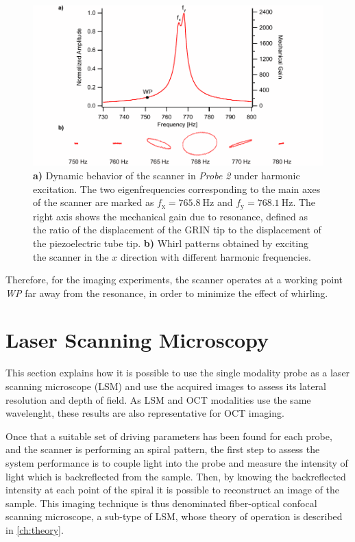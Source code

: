\begin{figure}[h!]\centering \includegraphics{figures/50_Measurements/bode/bodeWhirl.pdf}
      \caption{\textbf{a)} Dynamic behavior of the scanner in \textit{Probe 2} under harmonic excitation. The two eigenfrequencies corresponding to the main axes of the scanner are marked as $f_\mathrm{x} = \SI{765.8}{\hertz}$ and $f_\mathrm{y} = \SI{768.1}{\hertz}$. 
      The right axis shows the mechanical gain due to resonance, defined as the ratio of the displacement of the GRIN tip to the displacement of the piezoelectric tube tip.
      \textbf{b)} Whirl patterns obtained by exciting the scanner in the $x$ direction with different harmonic frequencies. }
      \label{fig:bode}
\end{figure}

Therefore, for the imaging experiments, the scanner operates at a working point \textit{WP} far away from the resonance, in order to minimize the effect of whirling.


\section{Laser Scanning Microscopy}
This section explains how it is possible to use the single modality probe as a laser scanning microscope (LSM) and use the acquired images to assess its lateral resolution and depth of field. As LSM and OCT modalities use the same wavelenght, these results are also representative for OCT imaging.

Once that a suitable set of driving parameters has been found for each probe, and the scanner is performing an spiral pattern, the first step to assess the system performance is to couple light into the probe and measure the intensity of light which is backreflected from the sample. Then, by knowing the backreflected intensity at each point of the spiral it is possible to reconstruct an image of the sample. This imaging technique is thus denominated fiber-optical confocal scanning microscope, a sub-type of LSM, whose theory of operation is described in \autoref{ch:theory}.


